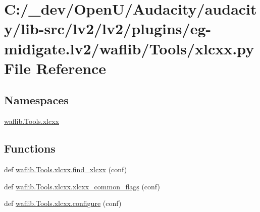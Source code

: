 \hypertarget{lv2_2plugins_2eg-midigate_8lv2_2waflib_2_tools_2xlcxx_8py}{}\section{C\+:/\+\_\+dev/\+Open\+U/\+Audacity/audacity/lib-\/src/lv2/lv2/plugins/eg-\/midigate.lv2/waflib/\+Tools/xlcxx.py File Reference}
\label{lv2_2plugins_2eg-midigate_8lv2_2waflib_2_tools_2xlcxx_8py}
\subsection*{Namespaces}
\begin{DoxyCompactItemize}
\item 
 \hyperlink{namespacewaflib_1_1_tools_1_1xlcxx}{waflib.\+Tools.\+xlcxx}
\end{DoxyCompactItemize}
\subsection*{Functions}
\begin{DoxyCompactItemize}
\item 
def \hyperlink{namespacewaflib_1_1_tools_1_1xlcxx_a8620e3d06d6be208c56bd82ebc223078}{waflib.\+Tools.\+xlcxx.\+find\+\_\+xlcxx} (conf)
\item 
def \hyperlink{namespacewaflib_1_1_tools_1_1xlcxx_a595cde6fb1bcdb1dea9bbabf310a807b}{waflib.\+Tools.\+xlcxx.\+xlcxx\+\_\+common\+\_\+flags} (conf)
\item 
def \hyperlink{namespacewaflib_1_1_tools_1_1xlcxx_a711febe8407f7d68502ceddf57b6a749}{waflib.\+Tools.\+xlcxx.\+configure} (conf)
\end{DoxyCompactItemize}

